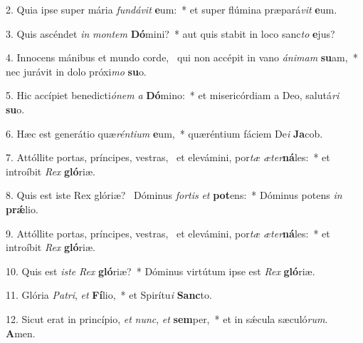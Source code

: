 2. Quia ipse super mária \textit{fun}\textit{dá}\textit{vit} \textbf{e}um:~*  et super flúmina præpará\textit{vit} \textbf{e}um.\

3. Quis ascéndet \textit{in} \textit{mon}\textit{tem} \textbf{Dó}mini?~*  aut quis stabit in loco sanc\textit{to} \textbf{e}jus?\

4. Innocens mánibus et mundo corde, \dag\  qui non accépit in vano \textit{á}\textit{ni}\textit{mam} \textbf{su}am,~*  nec jurávit in dolo próxi\textit{mo} \textbf{su}o.\

5. Hic accípiet benedicti\textit{ó}\textit{nem} \textit{a} \textbf{Dó}mino:~*  et misericórdiam a Deo, salutá\textit{ri} \textbf{su}o.\

6. Hæc est generátio quæ\textit{rén}\textit{ti}\textit{um} \textbf{e}um,~*  quæréntium fáciem De\textit{i} \textbf{Ja}cob.\

7. Attóllite portas, príncipes, vestras, \dag\  et elevámini, por\textit{tæ} \textit{æ}\textit{ter}\textbf{ná}les:~*  et introíbit \textit{Rex} \textbf{gló}riæ.\

8. Quis est iste Rex glóriæ? \dag\  Dóminus \textit{for}\textit{tis} \textit{et} \textbf{pot}ens:~*  Dóminus potens \textit{in} \textbf{prǽ}lio.\

9. Attóllite portas, príncipes, vestras, \dag\  et elevámini, por\textit{tæ} \textit{æ}\textit{ter}\textbf{ná}les:~*  et introíbit \textit{Rex} \textbf{gló}riæ.\

10. Quis est \textit{is}\textit{te} \textit{Rex} \textbf{gló}riæ?~*  Dóminus virtútum ipse est \textit{Rex} \textbf{gló}riæ.\

11. Glória \textit{Pa}\textit{tri}, \textit{et} \textbf{Fí}lio,~*  et Spirítu\textit{i} \textbf{Sanc}to.\

12. Sicut erat in princípio, \textit{et} \textit{nunc}, \textit{et} \textbf{sem}per,~*  et in sǽcula sæculó\textit{rum}. \textbf{A}men.\

